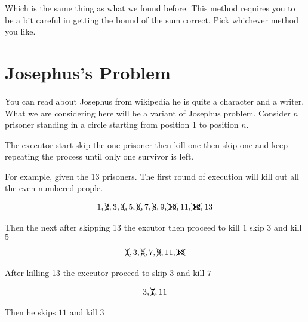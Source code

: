 \documentclass[a4paper, 12pt]{article}
\begin{document}
Which is the same thing as what we found before. This method requires you to be a bit careful in getting the bound of the sum correct. Pick whichever method you like.

\section*{Josephus's Problem}

You can read about Josephus from wikipedia he is quite a character and a writer. What we are considering here will be a variant of Josephus problem. Consider $n$ prisoner standing in a circle starting from position 1 to position $n$.

\begin{center}
\end{center}

The executor start skip the one prisoner then kill one then skip one and keep repeating the process until only one survivor is left.

For example, given the 13 prisoners. The first round of execution will kill out all the even-numbered people.

\begin{align*}
	1,\xcancel{2},3,\xcancel{4},5,\xcancel{6},7,\xcancel{8},9,\xcancel{10},11,\xcancel{12},13
\end{align*}

Then the next after skipping 13 the excutor then proceed to kill $1$ skip $3$ and kill $5$

\begin{align*}
\xcancel{1},3,\xcancel{5},7,\xcancel{9},11,\xcancel{13}
\end{align*}

After killing 13 the executor proceed to skip $3$ and kill $7$

\begin{align*}
3, \xcancel{7}, 11
\end{align*}

Then he skips $11$ and kill $3$
\end{document}
